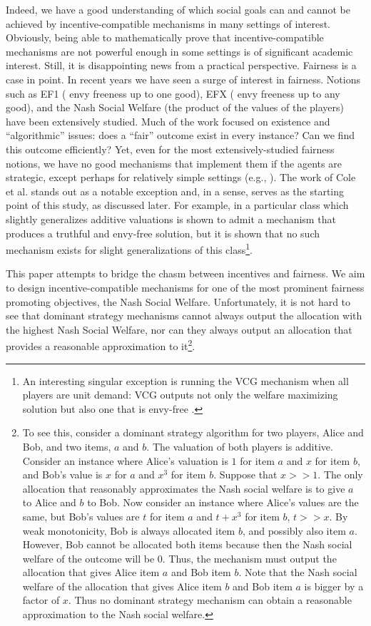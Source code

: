 \documentclass{article}
\begin{document}
Indeed, we have a good understanding of which social goals can and cannot be achieved by incentive-compatible mechanisms in many settings of interest. Obviously, being able to mathematically prove that incentive-compatible mechanisms are not powerful enough in some settings is of significant academic interest. Still, it is disappointing news from a practical perspective. Fairness is a case in point. In recent years we have seen a surge of interest in fairness. Notions such as EF1 (\cite{budish2011combinatorial} envy freeness up to one good), EFX (\cite{CKMPSW19} envy freeness up to any good), and the Nash Social Welfare (the product of the values of the players) have been extensively studied. Much of the work focused on existence and ``algorithmic'' issues: does a ``fair'' outcome exist in every instance? Can we find this outcome efficiently? Yet, even for the most extensively-studied fairness notions, we have no good mechanisms that implement them if the agents are strategic, except perhaps for relatively simple settings (e.g., \cite{BEF21,CFFKO11} ). {The work of Cole et al. \cite{CGG13} stands out as a notable exception and, in a sense, serves as the starting point of this study, as discussed later.} For example, in \cite{CFFKO11} a particular class which slightly generalizes additive valuations is shown to admit a mechanism that produces a truthful and envy-free solution, but it is shown that no such mechanism exists for slight generalizations of this class\footnote{An interesting singular exception is running the VCG mechanism when all players are unit demand: VCG outputs not only the welfare maximizing solution but also one that is envy-free \cite{L83}.}.

This paper attempts to bridge the chasm between incentives and fairness. We aim to design incentive-compatible mechanisms for one of the most prominent fairness promoting objectives, the Nash Social Welfare. Unfortunately, it is not hard to see that dominant strategy mechanisms cannot always output the allocation with the highest Nash Social Welfare, nor can they always output an allocation that provides a reasonable approximation to it\footnote{To see this, consider a dominant strategy algorithm for two players, Alice and Bob, and two items, $a$ and $b$. The valuation of both players is additive. Consider an instance where Alice's valuation is $1$ for item $a$ and $x$ for item $b$, and Bob's value is $x$ for $a$ and $x^3$ for item $b$. Suppose that $x>>1$. The only allocation that reasonably approximates the Nash social welfare is to give $a$ to Alice and $b$ to Bob. Now consider an instance where Alice's values are the same, but Bob's values are $t$ for item $a$ and $t+x^3$ for item $b$, $t>>x$. By weak monotonicity, Bob is always allocated item $b$, and possibly also item $a$. However, Bob cannot be allocated both items because then the Nash social welfare of the outcome will be $0$. Thus, the mechanism must output the allocation that gives Alice item $a$ and Bob item $b$. Note that the Nash social welfare of the allocation that gives Alice item $b$ and Bob item $a$ is bigger by a factor of $x$. Thus no dominant strategy mechanism can obtain a reasonable approximation to the Nash social welfare.}. 
\end{document}
